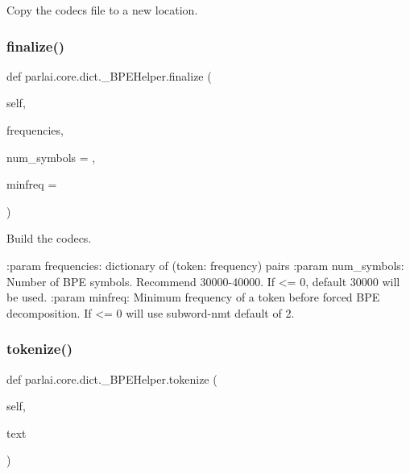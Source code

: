 \begin{DoxyVerb}Copy the codecs file to a new location.
\end{DoxyVerb}
 \mbox{\label{classparlai_1_1core_1_1dict_1_1__BPEHelper_ae93cf51522695ac3f45fc19eee94f64c}} 
\subsubsection{\texorpdfstring{finalize()}{finalize()}}
{\footnotesize\ttfamily def parlai.\+core.\+dict.\+\_\+\+B\+P\+E\+Helper.\+finalize (\begin{DoxyParamCaption}\item[{}]{self,  }\item[{}]{frequencies,  }\item[{}]{num\+\_\+symbols = {},  }\item[{}]{minfreq = {} }\end{DoxyParamCaption})}

\begin{DoxyVerb}Build the codecs.

:param frequencies:
    dictionary of (token: frequency) pairs
:param num_symbols:
    Number of BPE symbols. Recommend 30000-40000.  If <= 0, default
    30000 will be used.
:param minfreq:
    Minimum frequency of a token before forced BPE decomposition. If <=
    0 will use subword-nmt default of 2.
\end{DoxyVerb}
 \mbox{\label{classparlai_1_1core_1_1dict_1_1__BPEHelper_a1492c4bca01a00536eef0e3cc15f134b}} 
\subsubsection{\texorpdfstring{tokenize()}{tokenize()}}
{\footnotesize\ttfamily def parlai.\+core.\+dict.\+\_\+\+B\+P\+E\+Helper.\+tokenize (\begin{DoxyParamCaption}\item[{}]{self,  }\item[{}]{text }\end{DoxyParamCaption})}

